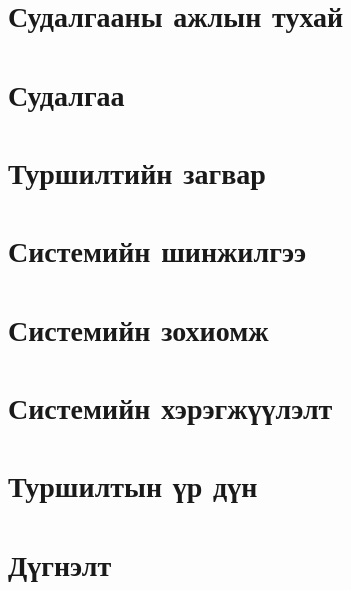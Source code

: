 
%

\chapter{Судалгааны ажлын тухай}


\chapter{Судалгаа}


\chapter{Туршилтийн загвар}


\chapter{Системийн шинжилгээ}


\chapter{Системийн зохиомж}


\chapter{Системийн хэрэгжүүлэлт}


\chapter{Туршилтын үр дүн}

	
\chapter{Дүгнэлт}
